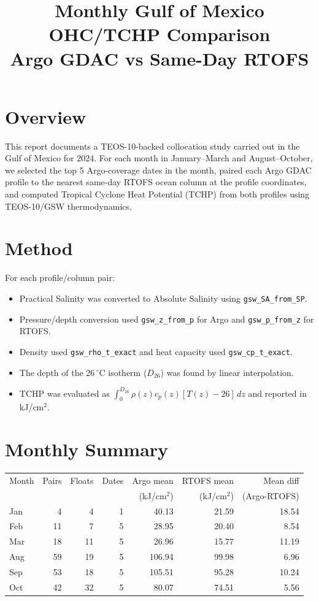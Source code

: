 \documentclass[11pt]{article}
\title{Monthly Gulf of Mexico OHC/TCHP Comparison\\Argo GDAC vs Same-Day RTOFS}
\date{}
\begin{document}
\maketitle

\section*{Overview}
This report documents a TEOS-10-backed collocation study carried out in the Gulf of Mexico
for 2024. For each month in January--March and August--October, we selected the top 5
Argo-coverage dates in the month, paired each Argo GDAC profile to the nearest same-day RTOFS
ocean column at the profile coordinates, and computed Tropical Cyclone Heat Potential (TCHP)
from both profiles using TEOS-10/GSW thermodynamics.

\section*{Method}
For each profile/column pair:
\begin{itemize}
\item Practical Salinity was converted to Absolute Salinity using \texttt{gsw\_SA\_from\_SP}.
\item Pressure/depth conversion used \texttt{gsw\_z\_from\_p} for Argo and \texttt{gsw\_p\_from\_z} for RTOFS.
\item Density used \texttt{gsw\_rho\_t\_exact} and heat capacity used \texttt{gsw\_cp\_t\_exact}.
\item The depth of the 26\,$^\circ$C isotherm ($D_{26}$) was found by linear interpolation.
\item TCHP was evaluated as $\int_0^{D_{26}} \rho(z) c_p(z) [T(z)-26]\,dz$ and reported in kJ/cm$^2$.
\end{itemize}

\section*{Monthly Summary}
\begin{table}[H]
\centering
\begin{tabular}{lrrrrrr}
\toprule
Month & Pairs & Floats & Dates & Argo mean & RTOFS mean & Mean diff \\
 &  &  &  & (kJ/cm$^2$) & (kJ/cm$^2$) & (Argo-RTOFS) \\
\midrule
Jan & 4 & 4 & 1 & 40.13 & 21.59 & 18.54 \\
Feb & 11 & 7 & 5 & 28.95 & 20.40 & 8.54 \\
Mar & 18 & 11 & 5 & 26.96 & 15.77 & 11.19 \\
Aug & 59 & 19 & 5 & 106.94 & 99.98 & 6.96 \\
Sep & 53 & 18 & 5 & 105.51 & 95.28 & 10.24 \\
Oct & 42 & 32 & 5 & 80.07 & 74.51 & 5.56 \\
\bottomrule
\end{tabular}
\end{table}
\end{document}
